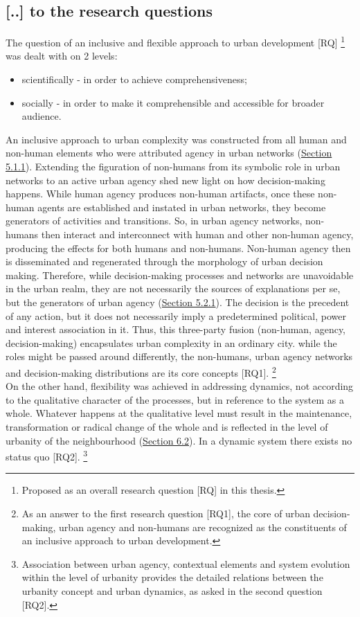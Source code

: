 \documentclass[11pt]{report}
\begin{document}
{{{\subsection{[..] to the research questions}

The question of an inclusive and flexible approach to urban development [RQ]
\footnote{Proposed as an overall research question [RQ] in this thesis.}
was dealt with on 2 levels:

\begin{itemize}
\item scientifically - in order to achieve comprehensiveness;
\item socially - in order to make it comprehensible and accessible for broader audience.
\end{itemize}

An inclusive approach to urban complexity was constructed from all human and non-human elements who were attributed agency in urban networks (\href{Section 5.1.1}{Section 5.1.1}).
Extending the figuration of non-humans from its symbolic role in urban networks to an active urban agency shed new light on how decision-making happens. While human agency produces non-human artifacts, once these non-human agents are established and instated in urban networks, they become generators of activities and transitions. So, in urban agency networks, non-humans then interact and interconnect with human and other non-human agency, producing the effects for both humans and non-humans. Non-human agency then is disseminated and regenerated through the morphology of urban decision making. Therefore, while decision-making processes and networks are unavoidable in the urban realm, they are not necessarily the sources of explanations per se, but the generators of urban agency (\href{Section 5.2.1}{Section 5.2.1}). The decision is the precedent of any action, but it does not necessarily imply a predetermined political, power and interest association in it. Thus, this three-party fusion (non-human, agency, decision-making) encapsulates urban complexity in an ordinary city. while the roles might be passed around differently, the non-humans, urban agency networks and decision-making distributions are its core concepts [RQ1].
\footnote{As an answer to the first research question [RQ1], the core of urban decision-making, urban agency and non-humans are recognized as the constituents of an inclusive approach to urban development.}
\\

On the other hand, flexibility was achieved in addressing dynamics, not according to the qualitative character of the processes, but in reference to the system as a whole. Whatever happens at the qualitative level must result in the maintenance, transformation or radical change of the whole and is reflected in the level of urbanity of the neighbourhood (\href{Section 6.2}{Section 6.2}). In a dynamic system there exists no status quo [RQ2].
\footnote{Association between urban agency, contextual elements and system evolution within the level of urbanity provides the detailed relations between the urbanity concept and urban dynamics, as asked in the second question [RQ2].}
\\

}}}
\end{document}
